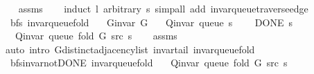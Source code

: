 \begin{isabellebody}
%
\isadelimproof
\ \ %
\endisadelimproof
%
\isatagproof
{}\isamarkupfalse%
\ assms\isanewline
\ \ \isamarkupfalse%
\ {\isacharparenleft}{\kern0pt}induct\ l\ arbitrary{\isacharcolon}{\kern0pt}\ s{\isacharparenright}{\kern0pt}\ {\isacharparenleft}{\kern0pt}simp{\isacharunderscore}{\kern0pt}all\ add{\isacharcolon}{\kern0pt}\ invar{\isacharunderscore}{\kern0pt}queue{\isacharunderscore}{\kern0pt}traverse{\isacharunderscore}{\kern0pt}edge{\isacharparenright}{\kern0pt}%
\endisatagproof
{\isafoldproof}%
%
\isadelimproof
\isanewline
%
\endisadelimproof
\isanewline
{}\isamarkupfalse%
\ {\isacharparenleft}{\kern0pt}\ bfs{\isacharparenright}{\kern0pt}\ invar{\isacharunderscore}{\kern0pt}queue{\isacharunderscore}{\kern0pt}fold{\isacharunderscore}{\kern0pt}{}{\isacharcolon}{\kern0pt}\isanewline
\ \ \ {\isachardoublequoteopen}G{\isachardot}{\kern0pt}invar\ G{\isachardoublequoteclose}\isanewline
\ \ \ {\isachardoublequoteopen}Q{\isacharunderscore}{\kern0pt}invar\ {\isacharparenleft}{\kern0pt}queue\ s{\isacharparenright}{\kern0pt}{\isachardoublequoteclose}\isanewline
\ \ \ {\isachardoublequoteopen}{\isasymnot}\ DONE\ s{\isachardoublequoteclose}\isanewline
\ \ \ {\isachardoublequoteopen}Q{\isacharunderscore}{\kern0pt}invar\ {\isacharparenleft}{\kern0pt}queue\ {\isacharparenleft}{\kern0pt}fold\ G\ src\ s{\isacharparenright}{\kern0pt}{\isacharparenright}{\kern0pt}{\isachardoublequoteclose}\isanewline
%
\isadelimproof
\ \ %
\endisadelimproof
%
\isatagproof
{}\isamarkupfalse%
\ assms\isanewline
\ \ \isamarkupfalse%
\ {\isacharparenleft}{\kern0pt}auto\ intro{\isacharcolon}{\kern0pt}\ G{\isachardot}{\kern0pt}distinct{\isacharunderscore}{\kern0pt}adjacency{\isacharunderscore}{\kern0pt}list\ invar{\isacharunderscore}{\kern0pt}tail\ invar{\isacharunderscore}{\kern0pt}queue{\isacharunderscore}{\kern0pt}fold{\isacharparenright}{\kern0pt}%
\endisatagproof
{\isafoldproof}%
%
\isadelimproof
\isanewline
%
\endisadelimproof
\isanewline
{}\isamarkupfalse%
\ {\isacharparenleft}{\kern0pt}\ bfs{\isacharunderscore}{\kern0pt}invar{\isacharunderscore}{\kern0pt}not{\isacharunderscore}{\kern0pt}DONE{\isacharparenright}{\kern0pt}\ invar{\isacharunderscore}{\kern0pt}queue{\isacharunderscore}{\kern0pt}fold{\isacharcolon}{\kern0pt}\isanewline
\ \ \ {\isachardoublequoteopen}Q{\isacharunderscore}{\kern0pt}invar\ {\isacharparenleft}{\kern0pt}queue\ {\isacharparenleft}{\kern0pt}fold\ G\ src\ s{\isacharparenright}{\kern0pt}{\isacharparenright}{\kern0pt}{\isachardoublequoteclose}\isanewline

\end{isabellebody}
